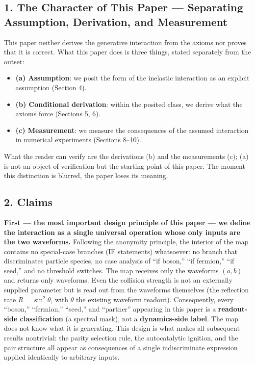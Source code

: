 \documentclass[
  a4paper,
]{article}
\providecommand{\tightlist}{%
  \setlength{\itemsep}{0pt}\setlength{\parskip}{0pt}}
\begin{document}
\subsection{1. The Character of This Paper --- Separating Assumption,
Derivation, and
Measurement}\label{the-character-of-this-paper-separating-assumption-derivation-and-measurement}

This paper neither derives the generative interaction from the axioms
nor proves that it is correct. What this paper does is three things,
stated separately from the outset:

\begin{itemize}
\tightlist
\item
  \textbf{(a) Assumption}: we posit the form of the inelastic
  interaction as an explicit assumption (Section 4).
\item
  \textbf{(b) Conditional derivation}: within the posited class, we
  derive what the axioms force (Sections 5, 6).
\item
  \textbf{(c) Measurement}: we measure the consequences of the assumed
  interaction in numerical experiments (Sections 8--10).
\end{itemize}

What the reader can verify are the derivations (b) and the measurements
(c); (a) is not an object of verification but the starting point of this
paper. The moment this distinction is blurred, the paper loses its
meaning.

\subsection{2. Claims}\label{claims}

\textbf{First --- the most important design principle of this paper ---
we define the interaction as a single universal operation whose only
inputs are the two waveforms.} Following the anonymity principle, the
interior of the map contains no special-case branches (IF statements)
whatsoever: no branch that discriminates particle species, no case
analysis of ``if boson,'' ``if fermion,'' ``if seed,'' and no threshold
switches. The map receives only the waveforms \((a,b)\) and returns only
waveforms. Even the collision strength is not an externally supplied
parameter but is read out from the waveforms themselves (the reflection
rate \(R=\sin^2\theta\), with \(\theta\) the existing waveform readout).
Consequently, every ``boson,'' ``fermion,'' ``seed,'' and ``partner''
appearing in this paper is a \textbf{readout-side classification} (a
spectral mask), not a \textbf{dynamics-side label}. The map does not
know what it is generating. This design is what makes all subsequent
results nontrivial: the parity selection rule, the autocatalytic
ignition, and the pair structure all appear as consequences of a single
indiscriminate expression applied identically to arbitrary inputs.
\end{document}
